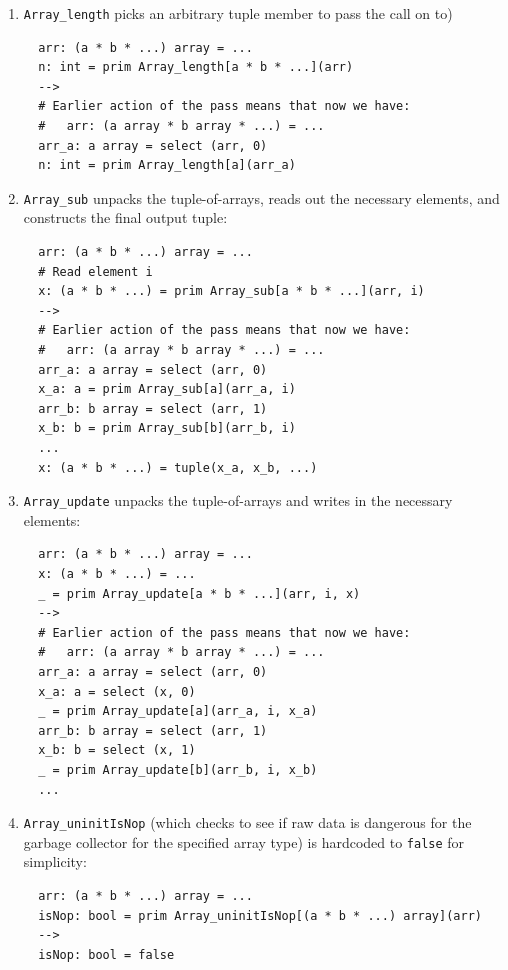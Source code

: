 \documentclass[leqno,11pt]{article}
\begin{document}
\begin{enumerate}
\item \texttt{Array\_length} picks an arbitrary tuple member to pass the call on to)
\begin{verbatim}
  arr: (a * b * ...) array = ...
  n: int = prim Array_length[a * b * ...](arr)
  -->
  # Earlier action of the pass means that now we have:
  #   arr: (a array * b array * ...) = ...
  arr_a: a array = select (arr, 0)
  n: int = prim Array_length[a](arr_a)
\end{verbatim}

\item \texttt{Array\_sub} unpacks the tuple-of-arrays, reads out the necessary
  elements, and constructs the final output tuple:

\begin{verbatim}
  arr: (a * b * ...) array = ...
  # Read element i
  x: (a * b * ...) = prim Array_sub[a * b * ...](arr, i)
  -->
  # Earlier action of the pass means that now we have:
  #   arr: (a array * b array * ...) = ...
  arr_a: a array = select (arr, 0)
  x_a: a = prim Array_sub[a](arr_a, i)
  arr_b: b array = select (arr, 1)
  x_b: b = prim Array_sub[b](arr_b, i)
  ...
  x: (a * b * ...) = tuple(x_a, x_b, ...)
\end{verbatim}

\item \texttt{Array\_update} unpacks the tuple-of-arrays and writes in the
  necessary elements:

\begin{verbatim}
  arr: (a * b * ...) array = ...
  x: (a * b * ...) = ...
  _ = prim Array_update[a * b * ...](arr, i, x)
  -->
  # Earlier action of the pass means that now we have:
  #   arr: (a array * b array * ...) = ...
  arr_a: a array = select (arr, 0)
  x_a: a = select (x, 0)
  _ = prim Array_update[a](arr_a, i, x_a)
  arr_b: b array = select (arr, 1)
  x_b: b = select (x, 1)
  _ = prim Array_update[b](arr_b, i, x_b)
  ...
\end{verbatim}

\item \texttt{Array\_uninitIsNop} (which checks to see if raw data is dangerous
  for the garbage collector for the specified array type) is hardcoded to
  \texttt{false} for simplicity:

\begin{verbatim}
  arr: (a * b * ...) array = ...
  isNop: bool = prim Array_uninitIsNop[(a * b * ...) array](arr)
  -->
  isNop: bool = false
\end{verbatim}


\end{enumerate}
\end{document}
